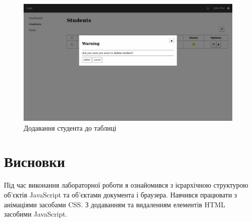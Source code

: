 \documentclass[oneside,14pt]{extarticle}
\begin{document}
\begin{normalsize}
	\begin{figure}[H]
		\centering
		\includegraphics[scale=0.35]{2}
		\caption{Додавання студента до таблиці}
	\end{figure}

	\section*{Висновки}
	Під час виконання лабораторної роботи я ознайомився з ієрархічною структурою об’єктів JavaScript та об’єктами
	документа і браузера. Навчився працювати з анімаціями засобами CSS. З додаванням та видаленням елементів HTML засобими JavaScript.
	    
\end{normalsize}
\end{document}
